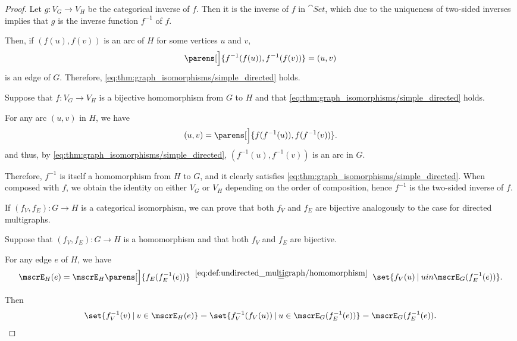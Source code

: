 \begin{proof}
  Let \( g: V_G \to V_H \) be the categorical inverse of \( f \). Then it is the inverse of \( f \) in \( \cat{Set} \), which due to the uniqueness of two-sided inverses implies that \( g \) is the inverse function \( f^{-1} \) of \( f \).

  Then, if \( (f(u), f(v)) \) is an arc of \( H \) for some vertices \( u \) and \( v \),
  \begin{equation*}
    \parens[\Big]{ f^{-1}(f(u)), f^{-1}(f(v)) } = (u, v)
  \end{equation*}
  is an edge of \( G \). Therefore, \eqref{eq:thm:graph_isomorphisms/simple_directed} holds.

  \NecessitySubProof* Suppose that \( f: V_G \to V_H \) is a bijective homomorphism from \( G \) to \( H \) and that \eqref{eq:thm:graph_isomorphisms/simple_directed} holds.

  For any arc \( (u, v) \) in \( H \), we have
  \begin{equation*}
    (u, v) = \parens[\Big]{ f(f^{-1}(u)), f(f^{-1}(v)) }.
  \end{equation*}
  and thus, by \eqref{eq:thm:graph_isomorphisms/simple_directed}, \( (f^{-1}(u), f^{-1}(v)) \) is an arc in \( G \).

  Therefore, \( f^{-1} \) is itself a homomorphism from \( H \) to \( G \), and it clearly satisfies \eqref{eq:thm:graph_isomorphisms/simple_directed}. When composed with \( f \), we obtain the identity on either \( V_G \) or \( V_H \) depending on the order of composition, hence \( f^{-1} \) is the two-sided inverse of \( f \).


  \SufficiencySubProof* If \( (f_V, f_E): G \to H \) is a categorical isomorphism, we can prove that both \( f_V \) and \( f_E \) are bijective analogously to the case for directed multigraphs.

  \NecessitySubProof* Suppose that \( (f_V, f_E): G \to H \) is a homomorphism and that both \( f_V \) and \( f_E \) are bijective.

  For any edge \( e \) of \( H \), we have
  \begin{equation*}
    \mscrE_H(e)
    =
    \mscrE_H\parens[\Big]{ f_E(f_E^{-1}(e)) }
    \reloset {\eqref{eq:def:undirected_multigraph/homomorphism}} =
    \set{ f_V(u) \given u in \mscrE_G(f_E^{-1}(e)) }.
  \end{equation*}

  Then
  \begin{equation*}
    \set{ f_V^{-1}(v) \given v \in \mscrE_H(e) }
    =
    \set{ f_V^{-1}(f_V(u)) \given u \in \mscrE_G(f_E^{-1}(e)) }
    =
    \mscrE_G(f_E^{-1}(e)).
  \end{equation*}


\end{proof}
